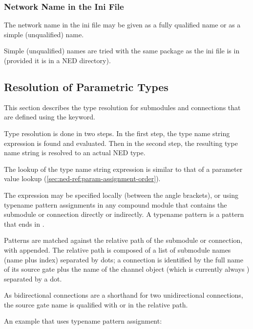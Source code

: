 \subsubsection{Network Name in the Ini File}
\label{sec:ned-ref:network-name-in-ini-file}

The network name in the ini file may be given as a fully qualified name
or as a simple (unqualified) name.

Simple (unqualified) names are tried with the same package as the
ini file is in (provided it is in a NED directory).


\subsection{Resolution of Parametric Types}
\label{sec:ned-ref:parameteric-type-resolution}

This section describes the type resolution for submodules and connections
that are defined using the  keyword.

Type resolution is done in two steps. In the first step, the type name
string expression is found and evaluated. Then in the second step, the
resulting type name string is resolved to an actual NED type.

 The lookup of the type name string expression is similar to
that of a parameter value lookup (\ref{sec:ned-ref:param-assignment-order}).

The expression may be specified locally (between the angle brackets), or
using typename pattern assignments in any compound module that
contains the submodule or connection directly or indirectly. A
typename pattern is a pattern that ends in .

Patterns are matched against the relative path of the submodule or
connection, with  appended. The relative path is
composed of a list of submodule names (name plus index) separated
by dots; a connection is identified by the full name of its source
gate plus the name of the channel object (which is currently always
) separated by a dot.

\begin{note}
As bidirectional connections are a shorthand for two unidirectional
connections, the source gate name is qualified with  or
 in the relative path.
\end{note}

An example that uses typename pattern assignment:

